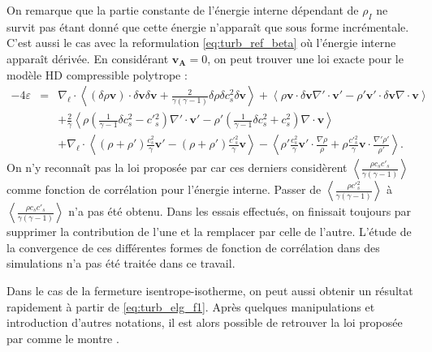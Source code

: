 On remarque que la partie constante de l'énergie interne dépendant de $\rho_I$ ne survit pas étant donné que cette énergie n'apparaît que sous forme incrémentale. C'est aussi le cas avec la reformulation \eqref{eq:turb_ref_beta} où l'énergie interne apparaît dérivée. En considérant $\boldsymbol{v_A} = 0$, on peut trouver une loi exacte pour le modèle \ac{HD} compressible polytrope :  
\begin{eqnarray}
-4\varepsilon &=& \nabla_{\boldsymbol{\ell}} \cdot \left<\left(\delta \rho\boldsymbol{v}\right) \cdot \delta \boldsymbol{v}\delta \boldsymbol{v} + \frac{2}{\gamma\left(\gamma-1\right)} \delta \rho  \delta c^2_s \delta \boldsymbol{v}\right> +\left< \rho \boldsymbol{v} \cdot \delta \boldsymbol{v}  \nabla' \cdot \boldsymbol{v'} - \rho' \boldsymbol{v'} \cdot \delta \boldsymbol{v} \nabla \cdot \boldsymbol{v}\right>\nonumber\\
&&+   \frac{2}{\gamma} \left<\rho \left(\frac{1}{\gamma-1} \delta c^2_s - c'{}^2_s\right)\nabla' \cdot \boldsymbol{v'}  - \rho' \left(\frac{1}{\gamma-1}\delta c^2_s + c^2_s\right) \nabla \cdot \boldsymbol{v} \right>\\
&&+  \nabla_{\boldsymbol{\ell}} \cdot \left< \left(\rho+\rho'\right) \frac{c^2_s}{\gamma} \boldsymbol{v'} -  \left(\rho+\rho'\right) \frac{c'{}^2_s}{\gamma}  \boldsymbol{v} \right> - \left<\rho' \frac{c^2_s}{\gamma}  \boldsymbol{v'} \cdot \frac{\nabla \rho}{\rho} + \rho \frac{c'{}^2_s}{\gamma} \boldsymbol{v} \cdot \frac{\nabla' \rho'}{\rho'} \right> .\nonumber
\end{eqnarray} 
On n'y reconnaît pas la loi proposée par \cite{banerjee_kolmogorov-like_2014} car ces derniers considèrent $\left<\frac{\rho c_s c'_s}{\gamma\left(\gamma-1\right)}\right>$ comme fonction de corrélation pour l'énergie interne. Passer de $\left<\frac{\rho c'{}^2_s }{\gamma\left(\gamma-1\right)}\right>$ à $\left<\frac{\rho c_s c'_s}{\gamma\left(\gamma-1\right)}\right>$ n'a pas été obtenu. Dans les essais effectués, on finissait toujours par supprimer la contribution de l'une et la remplacer par celle de l'autre. L'étude de la convergence de ces différentes formes de fonction de corrélation dans des simulations n'a pas été traitée dans ce travail.

Dans le cas de la fermeture isentrope-isotherme, on peut aussi obtenir un résultat rapidement à partir de \eqref{eq:turb_elg_f1}. Après quelques manipulations et introduction d'autres notations, il est alors possible de retrouver la loi proposée par \cite{andres_alternative_2017} comme le montre \cite{simon_general_2021}.

